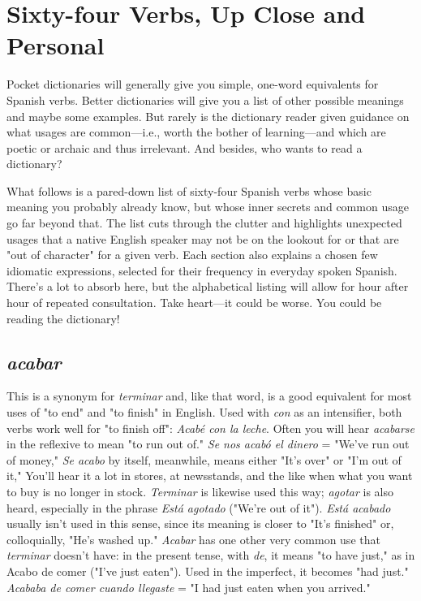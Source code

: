 \chapter{Sixty-four Verbs, Up Close and Personal}

Pocket dictionaries will generally give you simple, one-word
equivalents for Spanish verbs. Better dictionaries will give you a list of
other possible meanings and maybe some examples. But rarely is the
dictionary reader given guidance on what usages are common---i.e.,
worth the bother of learning---and which are poetic or archaic and thus
irrelevant. And besides, who wants to read a dictionary?

What follows is a pared-down list of sixty-four Spanish verbs
whose basic meaning you probably already know, but whose inner secrets and common usage go far beyond that. The list cuts through the
clutter and highlights unexpected usages that a native English speaker
may not be on the lookout for or that are "out of character" for a given
verb. Each section also explains a chosen few idiomatic expressions,
selected for their frequency in everyday spoken Spanish. There's a lot
to absorb here, but the alphabetical listing will allow for hour after
hour of repeated consultation. Take heart---it could be worse. You
could be reading the dictionary!

\section{\emph{acabar}}

This is a synonym for \emph{terminar} and, like that word, is a good
equivalent for most uses of "to end" and "to finish" in English. Used
with \emph{con} as an intensifier, both verbs work well for "to finish off":
\emph{Acabé con la leche}. Often you will hear \emph{acabarse} in the reflexive to
mean "to run out of." \emph{Se nos acabó el dinero} = "We've run out of
money," \emph{Se acabo} by itself, meanwhile, means either "It's over" or
"I'm out of it," You'll hear it a lot in stores, at newsstands, and the like
when what you want to buy is no longer in stock. \emph{Terminar} is likewise
used this way; \emph{agotar} is also heard, especially in the phrase \emph{Está agotado} ("We're out of it"). \emph{Está acabado} usually isn't used in this sense,
since its meaning is closer to "It's finished" or, colloquially, "He's
washed up." \emph{Acabar} has one other very common use that \emph{terminar}
doesn't have: in the present tense, with \emph{de}, it means "to have just,"
as in Acabo de comer ("I've just eaten"). Used in the imperfect, it becomes "had just." \emph{Acababa de comer cuando llegaste} = "I had just
eaten when you arrived."

